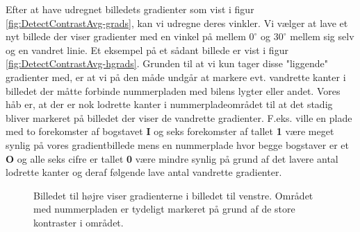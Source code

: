 Efter at have udregnet billedets gradienter som vist i figur \vref{fig:DetectContrastAvg-grads}, kan vi udregne deres vinkler. Vi vælger at lave et nyt billede der viser gradienter med en vinkel på mellem $0^{\circ}$ og $30^{\circ}$ mellem sig selv og en vandret linie. Et eksempel på et sådant billede er vist i figur \vref{fig:DetectContrastAvg-hgrads}. Grunden til at vi kun tager disse "liggende" gradienter med, er at vi på den måde undgår at markere evt. vandrette kanter i billedet der måtte forbinde nummerpladen med bilens lygter eller andet. Vores håb er, at der er nok lodrette kanter i nummerpladeområdet til at det stadig bliver markeret på billedet der viser de vandrette gradienter. F.eks. ville en plade med to forekomster af bogstavet \textbf{I} og seks forekomster af tallet \textbf{1} være meget synlig på vores gradientbillede mens en nummerplade hvor begge bogstaver er et \textbf{O} og alle seks cifre er tallet \textbf{0} være mindre synlig på grund af det lavere antal lodrette kanter og deraf følgende lave antal vandrette gradienter.
\begin{figure}[htbp]
  \centering
  \begin{minipage}[b]{5 cm}
  \end{minipage}
  \begin{minipage}[b]{5 cm}
  \end{minipage}
  \caption{Billedet til højre viser gradienterne i billedet til venstre. Området med nummerpladen er tydeligt markeret på grund af de store kontraster i området.}
  \label{fig:DetectContrastAvg-grads}
  \end{figure}

